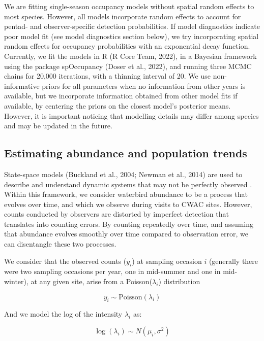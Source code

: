 \documentclass[utf8]{frontiersSCNS}
\begin{document}
We are fitting single-season occupancy models without spatial random
effects to most species. However, all models incorporate random effects
to account for pentad- and observer-specific detection probabilities. If
model diagnostics indicate poor model fit (see model diagnostics section
below), we try incorporating spatial random effects for occupancy
probabilities with an exponential decay function. Currently, we fit the
models in R (R Core Team, 2022), in a Bayesian framework using the
package spOccupancy (Doser et al., 2022), and running three MCMC chains
for 20,000 iterations, with a thinning interval of 20. We use
non-informative priors for all parameters when no information from other
years is available, but we incorporate information obtained from other
model fits if available, by centering the priors on the closest model's
posterior means. However, it is important noticing that modelling
details may differ among species and may be updated in the future.

\hypertarget{estimating-abundance-and-population-trends}{%
\subsection*{Estimating abundance and population
trends}\label{estimating-abundance-and-population-trends}}

State-space models (Buckland et al., 2004; Newman et al., 2014) are used
to describe and understand dynamic systems that may not be perfectly
observed . Within this framework, we consider waterbird abundance to be
a process that evolves over time, and which we observe during visits to
CWAC sites. However, counts conducted by observers are distorted by
imperfect detection that translates into counting errors. By counting
repeatedly over time, and assuming that abundance evolves smoothly over
time compared to observation error, we can disentangle these two
processes.

We consider that the observed counts (\(y_i\)) at sampling occasion
\(i\) (generally there were two sampling occasions per year, one in
mid-summer and one in mid-winter), at any given site, arise from a
Poisson(\(\lambda_i\)) distribution

\[y_i \sim \textrm{Poisson}(\lambda_i)\]

And we model the log of the intensity \(\lambda_i\) as:

\[\log{(\lambda_i)} \sim N(\mu_i, \sigma^2)\]
\end{document}
